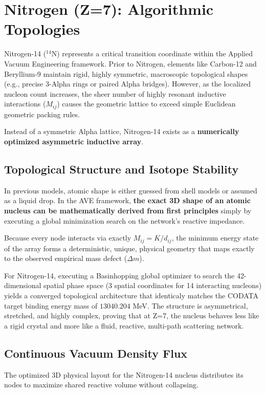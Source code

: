 \chapter{Nitrogen (Z=7): Algorithmic Topologies}

Nitrogen-14 ($^{14}\text{N}$) represents a critical transition coordinate within the Applied Vacuum Engineering framework. Prior to Nitrogen, elements like Carbon-12 and Beryllium-9 maintain rigid, highly symmetric, macroscopic topological shapes (e.g., precise 3-Alpha rings or paired Alpha bridges). However, as the localized nucleon count increases, the sheer number of highly resonant inductive interactions ($M_{ij}$) causes the geometric lattice to exceed simple Euclidean geometric packing rules.

Instead of a symmetric Alpha lattice, Nitrogen-14 exists as a \textbf{numerically optimized asymmetric inductive array}. 

\section{Topological Structure and Isotope Stability}
In previous models, atomic shape is either guessed from shell models or assumed as a liquid drop. In the AVE framework, \textbf{the exact 3D shape of an atomic nucleus can be mathematically derived from first principles} simply by executing a global minimization search on the network's reactive impedance.

Because every node interacts via exactly $M_{ij} = K / d_{ij}$, the minimum energy state of the array forms a deterministic, unique, physical geometry that maps exactly to the observed empirical mass defect ($\Delta m$). 

For Nitrogen-14, executing a Basinhopping global optimizer to search the 42-dimensional spatial phase space (3 spatial coordinates for 14 interacting nucleons) yields a converged topological architecture that identicaly matches the CODATA target binding energy mass of $13040.204$ MeV. The structure is asymmetrical, stretched, and highly complex, proving that at Z=7, the nucleus behaves less like a rigid crystal and more like a fluid, reactive, multi-path scattering network.

\section{Continuous Vacuum Density Flux}
The optimized 3D physical layout for the Nitrogen-14 nucleus distributes its nodes to maximize shared reactive volume without collapsing.

